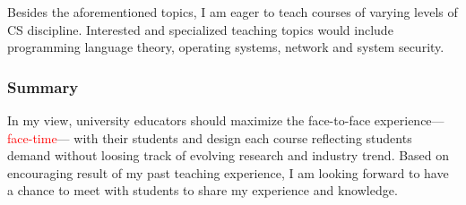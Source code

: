 \documentclass[letterpaper, 10pt]{article}
\newcommand{\jikk}[1]{{---\textcolor{red}{#1}---}}
\newcommand{\jikk}[1]{}
\begin{document}
\begin{small}
Besides the aforementioned topics, I am eager to teach courses of varying
levels of CS discipline. Interested and specialized teaching topics would
include programming language theory, operating systems, network and system
security.

\subsubsection*{Summary}

In my view, university educators should maximize the face-to-face
experience\jikk{face-time} with their students and design each course
reflecting students demand without loosing track of evolving
research and industry trend.
%
Based on encouraging result of my past teaching experience, I am looking
forward to have a chance to meet with students to share my experience and
knowledge. 

\end{small}
\end{document}
